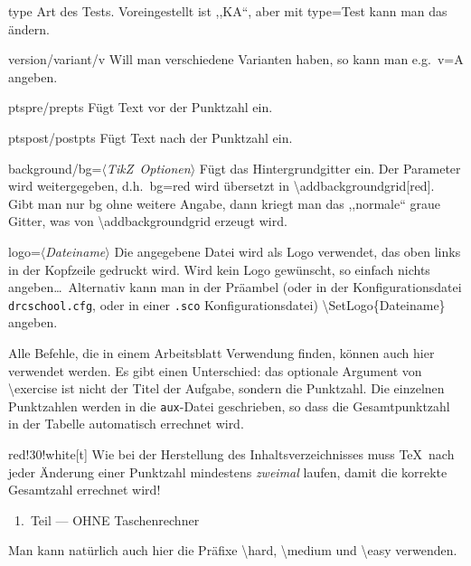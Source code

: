 \documentclass[hyperworksheet]{drcschool}
\newcommand*{\cs}[1]{\textup{\ttfamily\textbackslash#1}}                        %
\newcommand*{\opt}[1]{\textup{\ttfamily#1}}                                     %
\newcommand*{\param}[1]{\mbox{\normalfont$\langle$\textit{#1}$\rangle$}}        %
\newcommand*{\TikZ}{\textup{Ti\textit{k}Z}}                                     %
\begin{document}
\begin{test}[2,M,class=9a,date=32.\ Oktober 2022,v=A,ptspre=>,ptspost=<,logo=example-image]
\begin{compactdesc}
\item[\ttfamily type] Art des Tests. Voreingestellt ist ,,KA``, aber mit \opt{type=Test} kann man das ändern.
\item[\ttfamily version/variant/v] Will man verschiedene Varianten haben, so kann man
   e.g.~\opt{v=A} angeben.
\item[\ttfamily ptspre/prepts] Fügt Text vor der Punktzahl ein.
\item[\ttfamily ptspost/postpts] Fügt Text nach der Punktzahl ein.
\item[\ttfamily background/bg=\param{\TikZ\ Optionen}] Fügt das Hintergrundgitter ein. Der Parameter wird weitergegeben, d.h.\
   \opt{bg=red} wird übersetzt in \cs{addbackgroundgrid[red]}. Gibt man nur \opt{bg}
   ohne weitere Angabe, dann kriegt man das ,,normale`` graue Gitter, was von
   \cs{addbackgroundgrid} erzeugt wird.
\item[\ttfamily logo=\param{Dateiname}] Die angegebene Datei wird
   als Logo verwendet, das oben links in der Kopfzeile gedruckt wird. Wird kein Logo
   gewünscht, so einfach nichts angeben\ldots\ Alternativ kann man in der Präambel
   (oder in der Konfigurationsdatei \texttt{drcschool.cfg}, oder in einer
   \texttt{.sco} Konfigurationsdatei) \cs{SetLogo\{Dateiname\}} angeben.
\end{compactdesc}

Alle Befehle, die in einem Arbeitsblatt Verwendung finden, können auch hier
verwendet werden. Es gibt einen Unterschied: das optionale Argument von \cs{exercise}
ist nicht der Titel der Aufgabe, sondern die Punktzahl. Die einzelnen Punktzahlen
werden in die \texttt{aux}-Datei geschrieben, so dass die Gesamtpunktzahl in
der Tabelle automatisch errechnet wird.

\noindent
\begin{colorminipage}{red!30!white}[t]{\linewidth}
Wie bei der Herstellung des Inhaltsverzeichnisses muss \TeX\ nach jeder Änderung
einer Punktzahl mindestens \emph{zweimal} laufen, damit die korrekte Gesamtzahl
errechnet wird!
\end{colorminipage}

\begin{center}
\nocalculator\ 1.\ Teil --- OHNE Taschenrechner
\end{center}

\medium\exercise[0.5]
Man kann natürlich auch hier die Präfixe \cs{hard}, \cs{medium} und \cs{easy} verwenden.


\end{test}
\end{document}
